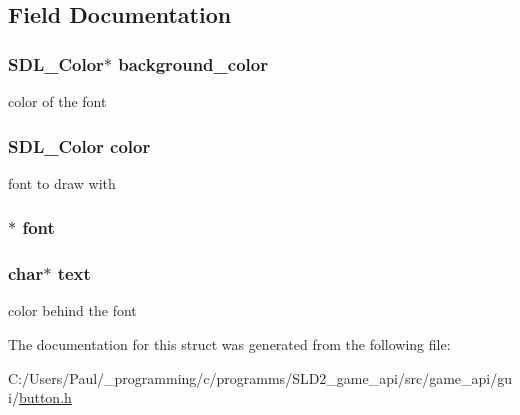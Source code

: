 \subsection{Field Documentation}
\hypertarget{struct___button___text___info_a32aa566db158516db085c8abc793cf33}{
\subsubsection[{background\+\_\+color}]{\setlength{\rightskip}{0pt plus 5cm}S\+D\+L\+\_\+\+Color$\ast$ background\+\_\+color}}\label{struct___button___text___info_a32aa566db158516db085c8abc793cf33}
color of the font \hypertarget{struct___button___text___info_a631bf4babe4c1825a2cdc0c19c2bd04f}{
\subsubsection[{color}]{\setlength{\rightskip}{0pt plus 5cm}S\+D\+L\+\_\+\+Color color}}\label{struct___button___text___info_a631bf4babe4c1825a2cdc0c19c2bd04f}
font to draw with \hypertarget{struct___button___text___info_a7cd87b1eaeb9bdee7ac16121086be6b8}{
\subsubsection[{font}]{$\ast$ font}}\label{struct___button___text___info_a7cd87b1eaeb9bdee7ac16121086be6b8}
\hypertarget{struct___button___text___info_a5633b1433389cec21ade3811bbe9ca5b}{
\subsubsection[{text}]{\setlength{\rightskip}{0pt plus 5cm}char$\ast$ text}}\label{struct___button___text___info_a5633b1433389cec21ade3811bbe9ca5b}
color behind the font 

The documentation for this struct was generated from the following file\+:\begin{DoxyCompactItemize}
\item 
C\+:/\+Users/\+Paul/\+\_\+programming/c/programms/\+S\+L\+D2\+\_\+game\+\_\+api/src/game\+\_\+api/gui/\hyperlink{button_8h}{button.\+h}\end{DoxyCompactItemize}
